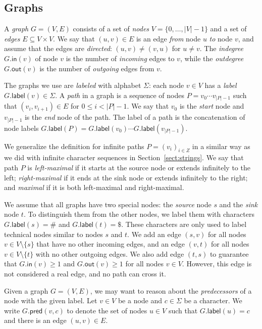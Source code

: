 \documentclass[a4paper,UKenglish]{lipics-v2016}
\newcommand{\set}[1]{\ensuremath{\{ #1 \}}}
\newcommand{\abs}[1]{\ensuremath{\lvert #1 \rvert}}
\newcommand{\gindegree}{\ensuremath{\mathsf{in}}}
\newcommand{\goutdegree}{\ensuremath{\mathsf{out}}}
\newcommand{\glabel}{\ensuremath{\mathsf{label}}}
\newcommand{\gpred}{\ensuremath{\mathsf{pred}}}
\begin{document}
\subsection{Graphs}\label{sect:graphs}

A \emph{graph} $G = (V, E)$ consists of a set of \emph{nodes} $V = \set{0, \dotsc, \abs{V}-1}$ and a set of \emph{edges} $E \subseteq V \times V$. We say that $(u, v) \in E$ is an edge \emph{from} node $u$ \emph{to} node $v$, and assume that the edges are \emph{directed}: $(u, v) \ne (v, u)$ for $u \ne v$. The \emph{indegree} $G.\gindegree(v)$ of node $v$ is the number of \emph{incoming} edges to $v$, while the \emph{outdegree} $G.\goutdegree(v)$ is the number of \emph{outgoing} edges from $v$.

The graphs we use are \emph{labeled} with alphabet $\Sigma$: each node $v \in V$ has a \emph{label} $G.\glabel(v) \in \Sigma$. A \emph{path} in a graph is a sequence of nodes $P = v_{0} \dotsm v_{\abs{P}-1}$ such that $(v_{i}, v_{i+1}) \in E$ for $0 \le i < \abs{P}-1$. We say that $v_{0}$ is the \emph{start} node and $v_{\abs{P}-1}$ is the \emph{end} node of the path. The label of a path is the concatenation of node labels $G.\glabel(P) = G.\glabel(v_{0}) \dotsm G.\glabel(v_{\abs{P}-1})$.

We generalize the definition for infinite paths $P = (v_{i})_{i \in Z}$ in a similar way as we did with infinite character sequences in Section~\ref{sect:strings}. We say that path $P$ is \emph{left-maximal} if it starts at the source node or extends infinitely to the left; \emph{right-maximal} if it ends at the sink node or extends infinitely to the right; and \emph{maximal} if it is both left-maximal and right-maximal.

We assume that all graphs have two special nodes: the \emph{source} node $s$ and the \emph{sink} node $t$. To distinguish them from the other nodes, we label them with characters $G.\glabel(s) = \#$ and $G.\glabel(t) = \$$. These characters are only used to label technical nodes similar to nodes $s$ and $t$. We add an edge $(s, v)$ for all nodes $v \in V \setminus \set{s}$ that have no other incoming edges, and an edge $(v, t)$ for all nodes $v \in V \setminus \set{t}$ with no other outgoing edges. We also add edge $(t, s)$ to guarantee that $G.\gindegree(v) \ge 1$ and $G.\goutdegree(v) \ge 1$ for all nodes $v \in V$. However, this edge is not considered a real edge, and no path can cross it.

Given a graph $G = (V, E)$, we may want to reason about the \emph{predecessors} of a node with the given label. Let $v \in V$ be a node and $c \in \Sigma$ be a character. We write $G.\gpred(v, c)$ to denote the set of nodes $u \in V$ such that $G.\glabel(u) = c$ and there is an edge $(u, v) \in E$.
\end{document}
